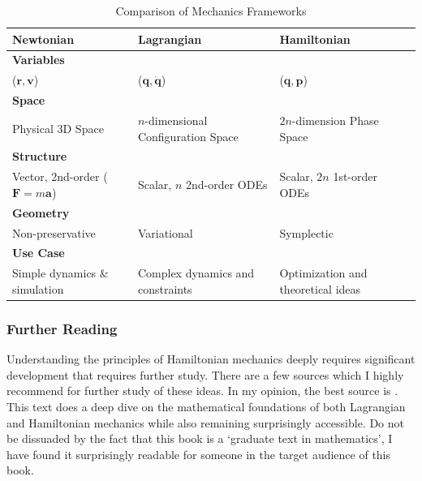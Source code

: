 \begin{table}[htbp]
\centering
\caption{Comparison of Mechanics Frameworks}
\label{tab:mechanics_comparison}
\begin{tabularx}{\textwidth}{X|X|X}
\toprule
\textbf{Newtonian} & \textbf{Lagrangian} & \textbf{Hamiltonian} \\ \midrule

\multicolumn{3}{l}{\textbf{Variables}} \\ \addlinespace
($\bm{r}, \bm{v}$)&($\bm{q}, \bm{\dot{q}}$)&($\bm{q}, \bm{p}$) \\ \midrule

\multicolumn{3}{l}{\textbf{Space}} \\ \addlinespace
Physical 3D Space & $n$-dimensional Configuration Space & $2n$-dimension Phase Space \\ \midrule

\multicolumn{3}{l}{\textbf{Structure}} \\ \addlinespace
Vector, 2nd-order ($\bm{F}=m\bm{a}$) & Scalar, $n$ 2nd-order ODEs & Scalar, $2n$ 1st-order ODEs \\ \midrule

\multicolumn{3}{l}{\textbf{Geometry}} \\ \addlinespace
Non-preservative & Variational & Symplectic \\ \midrule

\multicolumn{3}{l}{\textbf{Use Case}} \\ \addlinespace
Simple dynamics \& simulation & Complex dynamics and constraints & Optimization and theoretical ideas \\ \bottomrule
\end{tabularx}
\end{table}

\subsubsection{Further Reading}
Understanding the principles of Hamiltonian mechanics deeply requires significant development that requires further study. There are a few sources which I highly recommend for further study of these ideas. In my opinion, the best source is \cite{arnold_mathematical_1989}. This text does a deep dive on the mathematical foundations of both \gls{Lagrangian} and \gls{Hamiltonian} mechanics while also remaining surprisingly accessible. Do not be dissuaded by the fact that this book is a `graduate text in mathematics', I have found it surprisingly readable for someone in the target audience of this book.

